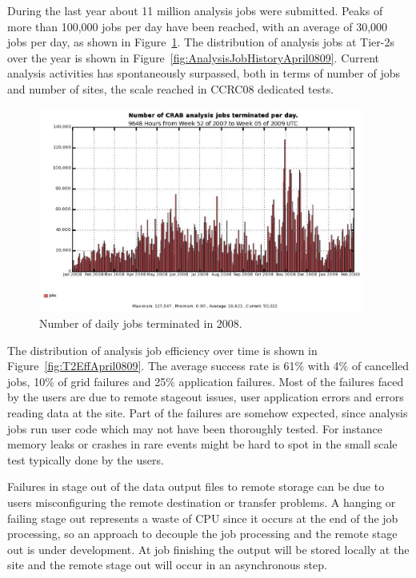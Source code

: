 During the last year about 11 million analysis jobs were submitted.  Peaks
of more than 100,000 jobs per day have been reached, with an average
of 30,000 jobs per day, as shown in Figure~\ref{fig:jobs}.
The distribution of analysis jobs at Tier-2s over the year is shown in Figure~\ref{fig:AnalysisJobHistoryApril0809}. Current analysis activities has spontaneously surpassed, both in terms of number of jobs and number of sites, the scale reached in CCRC08 dedicated tests. 
\begin{figure}
\includegraphics[width=0.95\textwidth]{crabjobsdaily.eps}
\caption{Number of daily jobs terminated in 2008. }
\label{fig:jobs}
\end{figure}

The distribution of analysis job efficiency over time is shown in Figure~\ref{fig:T2EffApril0809}. The average success rate is 61\% with 4\% of cancelled jobs, 10\% of grid failures and 25\% application failures.
Most of the failures faced by the users are due to remote stageout issues, user application errors and errors reading data at the site. 
Part of the failures are somehow expected, since analysis jobs run user code which may not have been thoroughly tested. For instance memory leaks or crashes in rare events might be hard to spot in the small scale test typically done by the users.

Failures in stage out of the data output files to remote storage can be due 
to users misconfiguring the remote destination or transfer problems.
A hanging or failing stage out represents a waste of CPU since it occurs at 
the end of the job processing, so an approach to decouple the job processing and the remote stage out is under development. At job finishing the output will be stored locally at the site and the remote stage out will occur in an asynchronous step.

